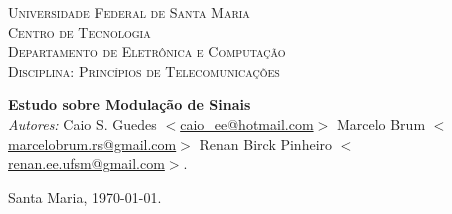 \begin{titlepage}
\begin{center}

\textsc{\LARGE Universidade Federal de Santa Maria}\\[1.5cm]
\textsc{\Large Centro de Tecnologia}\\[0.5cm]
\textsc{\Large Departamento de Eletrônica e Computação}\\[0.5cm]
\textsc{\Large Disciplina: Princípios de Telecomunicações}\\[0.5cm]
\setlength{\oddsidemargin}{0pt} %
\setlength{\evensidemargin}{0pt} %
\setlength{\textwidth}{15cm}
\end{center}

\vspace*{5cm}
\begin{center}
{\huge \bfseries Estudo sobre Modulação de Sinais}\\[0.4cm]
\vspace*{130px}
\emph{Autores:}
Caio S. Guedes $<$\url{caio_ee@hotmail.com}$>$
Marcelo Brum $<$\url{marcelobrum.rs@gmail.com}$>$
Renan Birck Pinheiro $<$\url{renan.ee.ufsm@gmail.com}$>$. \newline

Santa Maria, \today.

\end{center}




\end{titlepage}